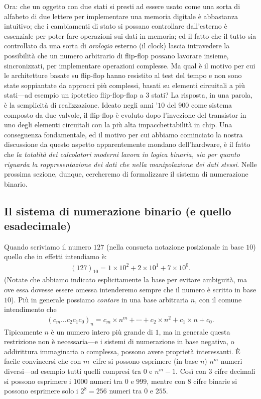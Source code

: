 Ora: che un oggetto con due stati si presti ad essere usato come una sorta di alfabeto
di due lettere per implementare una memoria digitale \`e abbastanza intuitivo;
che i cambiamenti di stato si possano controllare dall'esterno \`e essenziale per
poter fare operazioni sui dati in memoria; ed il fatto che il tutto sia controllato
da una sorta di \emph{orologio} esterno (il clock) lascia intravedere la possibilit\`a
che un numero arbitrario di flip-flop possano lavorare insieme, sincronizzati, per
implementare operazioni complesse. Ma qual \`e il motivo per cui le architetture
basate su flip-flop hanno resistito al test del tempo e non sono state soppiantate
da approcci pi\`u complessi, basati su elementi circuitali a pi\`u stati---ad esempio
un ipotetico flip-flop-flap a $3$ stati? La risposta, in una parola, \`e la semplicit\`a
di realizzazione. Ideato negli anni '$10$ del 900 come sistema composto da due valvole,
il flip-flop \`e evoluto dopo l'invezione del transistor in uno degli elementi circuitali
con la pi\`u alta impacchettabilit\`a in chip. Una conseguenza fondamentale, ed il
motivo per cui abbiamo cominciato la nostra discussione da questo aspetto apparentemente
mondano dell'hardware, \`e il fatto che \emph{la totalit\`a dei calcolatori moderni
lavora in logica binaria, sia per quanto riguarda la rappresentazione dei dati che
nella manipolazione dei dati stessi}. Nelle prossima sezione, dunque, cercheremo
di formalizzare il sistema di numerazione binario.


\subsection{Il sistema di numerazione binario (e quello esadecimale)}

Quando scriviamo il numero $127$ (nella consueta notazione posizionale in base
$10$) quello che in effetti intendiamo è:
\begin{align*}
  (127)_{10} = 1 \times 10^2 + 2 \times 10^1 + 7 \times 10^0.
\end{align*}
(Notate che abbiamo indicato esplicitamente la base per evitare ambiguità, ma
ove essa dovesse essere omessa intenderemo sempre che il numero è scritto in
base $10$). Più in generale possiamo \emph{contare} in una base arbitraria
$n$, con il comune intendimento che
\begin{align}\label{eq:numero_base_arbitraria}
  (c_m\ldots c_2c_1c_0)_n = c_m \times n^m + \cdots + c_2 \times n^2 +
  c_1 \times n + c_0.
\end{align}
Tipicamente $n$ è un numero intero più grande di $1$, ma in generale questa
restrizione non è necessaria---e i sistemi di numerazione in base negativa, o
addirittura immaginaria o complessa, possono avere proprietà interessanti.
\`E facile convincersi che con $m$~cifre si possono esprimere (in base $n$)
$n^m$ numeri diversi---ad esempio tutti quelli compresi tra $0$ e $n^m - 1$.
Così con $3$ cifre decimali si possono esprimere i $1000$ numeri tra $0$ e
$999$, mentre con $8$ cifre binarie si possono esprimere solo i $2^8 = 256$
numeri tra $0$ e $255$.

